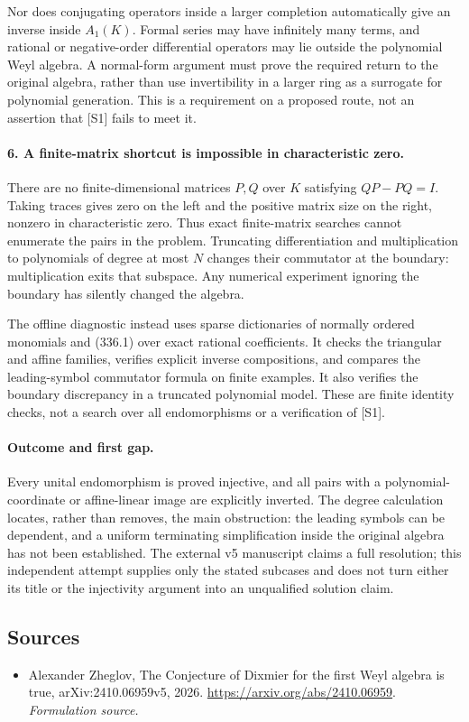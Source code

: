 \documentclass[11pt]{article}
\begin{document}
Nor does conjugating operators inside a larger completion automatically give an inverse inside $A_1(K)$. Formal series may have infinitely many terms, and rational or negative-order differential operators may lie outside the polynomial Weyl algebra. A normal-form argument must prove the required return to the original algebra, rather than use invertibility in a larger ring as a surrogate for polynomial generation. This is a requirement on a proposed route, not an assertion that [S1] fails to meet it.

\paragraph{6. A finite-matrix shortcut is impossible in characteristic zero.}
There are no finite-dimensional matrices $P,Q$ over $K$ satisfying $QP-PQ=I$. Taking traces gives zero on the left and the positive matrix size on the right, nonzero in characteristic zero. Thus exact finite-matrix searches cannot enumerate the pairs in the problem. Truncating differentiation and multiplication to polynomials of degree at most $N$ changes their commutator at the boundary: multiplication exits that subspace. Any numerical experiment ignoring the boundary has silently changed the algebra.

The offline diagnostic instead uses sparse dictionaries of normally ordered monomials and (336.1) over exact rational coefficients. It checks the triangular and affine families, verifies explicit inverse compositions, and compares the leading-symbol commutator formula on finite examples. It also verifies the boundary discrepancy in a truncated polynomial model. These are finite identity checks, not a search over all endomorphisms or a verification of [S1].

\paragraph{Outcome and first gap.}
Every unital endomorphism is proved injective, and all pairs with a polynomial-coordinate or affine-linear image are explicitly inverted. The degree calculation locates, rather than removes, the main obstruction: the leading symbols can be dependent, and a uniform terminating simplification inside the original algebra has not been established. The external v5 manuscript claims a full resolution; this independent attempt supplies only the stated subcases and does not turn either its title or the injectivity argument into an unqualified solution claim.

\subsection{Sources}
\begin{itemize}
\item[S1]Alexander Zheglov, The Conjecture of Dixmier for the first Weyl algebra is true, arXiv:2410.06959v5, 2026.
\url{https://arxiv.org/abs/2410.06959}.
\textit{Formulation source.}
\end{itemize}
\end{document}
